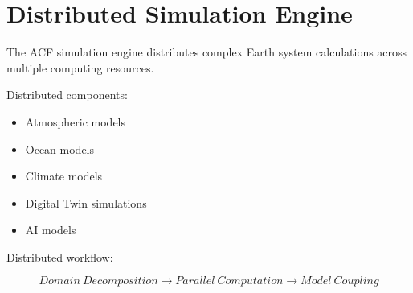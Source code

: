 \section{Distributed Simulation Engine}


The ACF simulation engine distributes complex Earth system
calculations across multiple computing resources.



Distributed components:


\begin{itemize}

\item Atmospheric models

\item Ocean models

\item Climate models

\item Digital Twin simulations

\item AI models

\end{itemize}



Distributed workflow:


\[
Domain\ Decomposition
\rightarrow
Parallel\ Computation
\rightarrow
Model\ Coupling
\]
